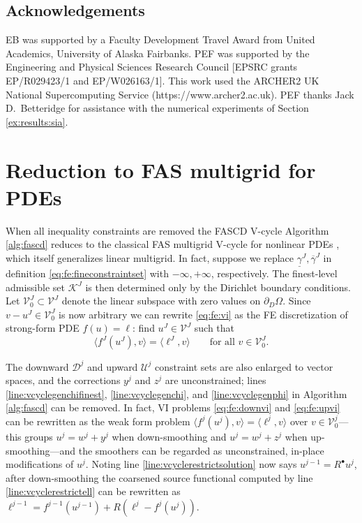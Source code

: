 \documentclass[letterpaper,final,12pt,reqno]{amsart}
\theoremstyle{cstyle}
\theoremstyle{cstyle*}
\theoremstyle{dstyle}
\numberwithin{equation}{section}
\numberwithin{figure}{section}
\numberwithin{table}{section}
\numberwithin{theorem}{section}
\newcommand{\ip}[2]{\langle#1,#2\rangle}
\newcommand{\iR}{R^{\bullet}}
\begin{document}
\subsection*{Acknowledgements} \label{sec:acknowledgements}  EB was supported by a Faculty Development Travel Award from United Academics, University of Alaska Fairbanks. PEF was supported by the Engineering and Physical Sciences Research Council [EPSRC grants EP/R029423/1 and EP/W026163/1]. This work used the ARCHER2 UK National Supercomputing Service (https://www.archer2.ac.uk). PEF thanks Jack D.~Betteridge for assistance with the numerical experiments of Section \ref{ex:results:sia}.







\appendix
\section{Reduction to FAS multigrid for PDEs} \label{app:reductions}

When all inequality constraints are removed the FASCD V-cycle Algorithm \ref{alg:fascd} reduces to the classical FAS multigrid V-cycle for nonlinear PDEs \cite{Brandt1977,Trottenbergetal2001}, which itself generalizes linear multigrid.  In fact, suppose we replace $\underline{\gamma}^J,\overline{\gamma}^J$ in definition \eqref{eq:fe:fineconstraintset} with $-\infty,+\infty$, respectively.  The finest-level admissible set $\mathcal{K}^J$ is then determined only by the Dirichlet boundary conditions.  Let $\mathcal{V}_0^J \subset \mathcal{V}^J$ denote the linear subspace with zero values on $\partial_D\Omega$.  Since $v-u^J\in\mathcal{V}_0^J$ is now arbitrary we can rewrite \eqref{eq:fe:vi} as the FE discretization of strong-form PDE $f(u)=\ell$: find $u^J \in \mathcal{V}^J$ such that
\begin{equation}
\ip{f^J(u^J)}{v} = \ip{\ell^J}{v} \qquad \text{for all } v\in \mathcal{V}_0^J. \label{eq:app:fas:pde}
\end{equation}

The downward $\mathcal{D}^j$ and upward $\mathcal{U}^j$ constraint sets are also enlarged to vector spaces, and the corrections $y^j$ and $z^j$ are unconstrained; lines \ref{line:vcyclegenchifinest}, \ref{line:vcyclegenchi}, and \ref{line:vcyclegenphi} in Algorithm \ref{alg:fascd} can be removed.  In fact, VI problems \eqref{eq:fe:downvi} and \eqref{eq:fe:upvi} can be rewritten as the weak form problem $\ip{f^j(u^j)}{v} = \ip{\ell^j}{v}$ over $v\in \mathcal{V}_0^j$---this groups $u^j=w^j+y^j$ when down-smoothing and $u^j=w^j+z^j$ when up-smoothing---and the smoothers can be regarded as unconstrained, in-place modifications of $u^j$.  Noting line \ref{line:vcyclerestrictsolution} now says $u^{j-1}=\iR u^j$, after down-smoothing the coarsened source functional computed by line \ref{line:vcyclerestrictell} can be rewritten as $\ell^{j-1} = f^{j-1}\left(u^{j-1}\right) + R\left(\ell^j-f^j(u^j)\right)$.
\end{document}
